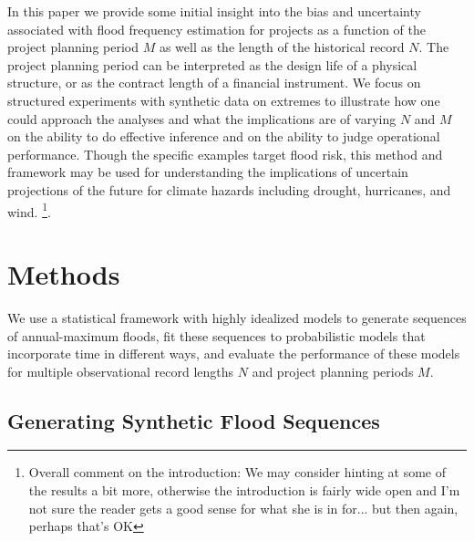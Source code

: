 \documentclass[12pt]{article}
\begin{document}
In this paper we provide some initial insight into the bias and uncertainty associated with flood frequency estimation for projects as a function of the project planning period $M$ as well as the length of the historical record $N$.
The project planning period can be interpreted as the design life of a physical structure, or as the contract length of a financial instrument.
We focus on structured experiments with synthetic data on extremes to illustrate how one could approach the analyses and what the implications are of varying $N$ and $M$ on the ability to do effective inference and on the ability to judge operational performance.
Though the specific examples target flood risk, this method and framework may be used for understanding the implications of uncertain projections of the future for climate hazards including drought, hurricanes, and wind. \footnote{Overall comment on the introduction:  We may consider hinting at some of the results a bit more, otherwise the introduction is fairly wide open and I'm not sure the reader gets a good sense for what she is in for... but then again, perhaps that's OK}.


\section{Methods}\label{sec:methods}

We use a statistical framework with highly idealized models to generate sequences of annual-maximum floods, fit these sequences to probabilistic models that incorporate time in different ways, and evaluate the performance of these models for multiple observational record lengths $N$ and project planning periods $M$.

\subsection{Generating Synthetic Flood Sequences\label{sec:methods-generating}}
\end{document}
